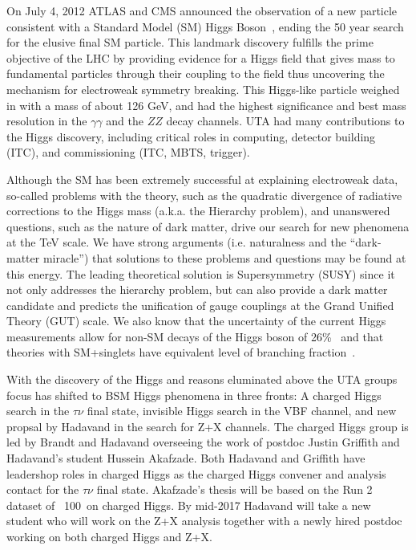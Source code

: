 On July 4, 2012 ATLAS and CMS announced the observation of a new particle consistent with a Standard Model (SM) Higgs Boson~\cite{ATLAS-Higgs-Observation, CMS-Higgs-Observation}, ending the 50 year search for the elusive final SM particle. This landmark discovery fulfills the prime objective of the LHC by providing evidence for a Higgs field that gives mass to fundamental particles through their coupling to the field thus uncovering the mechanism for  electroweak symmetry breaking.
This Higgs-like particle weighed in with a mass of about 126 GeV, and had the highest significance
and best mass resolution  in the $\gamma\gamma$ and the $ZZ$ decay channels.
UTA had many contributions to the Higgs discovery, including critical roles in computing,
detector building (ITC), and commissioning (ITC, MBTS, trigger).

Although the SM has been extremely successful at explaining electroweak data, so-called problems with the theory, such as the quadratic divergence of radiative corrections to the Higgs mass (a.k.a. the Hierarchy problem), and unanswered questions, such as the nature of dark matter, drive our search for new phenomena at the TeV scale. We have strong arguments (i.e. naturalness and the ``dark-matter miracle'') 
that solutions to these problems and questions may be found at this energy. 
The leading theoretical solution is Supersymmetry (SUSY) since it not only addresses the hierarchy problem, but can also provide a dark matter candidate and predicts the unification of gauge couplings at the Grand Unified Theory (GUT) scale.
We also know that the uncertainty of the current Higgs measurements allow for non-SM decays of the Higgs boson of 26\%~\cite{combin} and that theories with SM+singlets have equivalent level of branching fraction~\cite{exohiggs}.

With the discovery of the Higgs and reasons eluminated above the UTA groups focus has shifted to BSM Higgs phenomena in three fronts: A charged Higgs search in the $\tau \nu$ final state, invisible Higgs search in the VBF channel,
and new propsal by Hadavand in the search for Z+X channels.  The charged Higgs group is led by Brandt and Hadavand overseeing the work of postdoc Justin Griffith and Hadavand's student Hussein Akafzade.
Both Hadavand and Griffith have leadershop roles in charged Higgs as the charged Higgs convener and analysis contact for the $\tau \nu$ final state.  Akafzade's thesis will be based on the Run 2 dataset of ~100\invfb\ on charged Higgs.
By mid-2017 Hadavand will take a new student who will work on the Z+X analysis together with a newly hired postdoc working on both charged Higgs and Z+X.  

